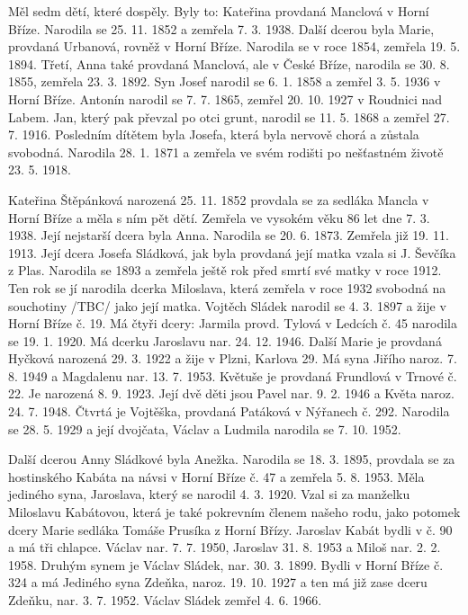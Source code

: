 \documentclass[../dejiny-rodu-prusiku.tex]{subfiles}
\begin{document}
Měl sedm dětí, které dospěly. Byly to: Kateřina provdaná Manclová v Horní Bříze. Narodila se 25. 11. 1852 a zemře­la 7. 3. 1938. Další dcerou byla Marie, provdaná Urbanová, rovněž v Horní Bříze. Narodila se v roce 1854, zemře­la 19. 5. 1894. Třetí, Anna také provdaná Manclová, ale v České Bříze, narodila se 30. 8. 1855, zemřela 23. 3. 1892. Syn Josef narodil se 6. 1. 1858 a zemřel 3. 5. 1936 v Horní Bříze. Antonín narodil se 7. 7. 1865, zemřel 20. 10. 1927 v Roudnici nad Labem. Jan, který pak převzal po otci grunt, narodil se 11. 5. 1868 a zemřel 27. 7. 1916. Posledním dítě­tem byla Josefa, která byla nervově chorá a zůstala svobodná. Narodila 28. 1. 1871 a zemřela ve svém rodišti po nešťastném životě 23. 5. 1918.

Kateřina Štěpánková narozená 25. 11. 1852 provdala se za sedláka Mancla v Horní Bříze a měla s ním pět dětí. Zemřela ve vysokém věku 86 let dne 7. 3. 1938. Její nejstarší dcera byla Anna. Narodila se 20. 6. 1873. Zemřela již 19. 11. 1913. Její dcera Josefa Sládková, jak byla provdaná její matka vzala si J. Ševčíka z Plas. Narodila se 1893 a zemře­la ještě rok před smrtí své matky v roce 1912. Ten rok se jí narodila dcerka Miloslava, která zemřela v roce 1932 svobodná na souchotiny /TBC/ jako její matka. Vojtěch Sládek narodil se 4. 3. 1897 a žije v Horní Bříze č. 19. Má čtyři dcery: Jarmila provd. Tylová v Ledcích č. 45 narodila se 19. 1. 1920. Má dcerku Jaroslavu nar. 24. 12. 1946. Další Marie je provdaná Hyčková narozená 29. 3. 1922 a ži­je v Plzni, Karlova 29. Má syna Jiřího naroz. 7. 8. 1949 a Magdalenu nar. 13. 7. 1953. Květuše je provdaná Frundlová v Trnové č. 22. Je narozená 8. 9. 1923. Její dvě děti jsou Pavel nar. 9. 2. 1946 a Květa naroz. 24. 7. 1948. Čtvrtá je Vojtěška, provdaná Patáková v Nýřanech č. 292. Narodila se 28. 5. 1929 a její dvojčata, Václav a Ludmila narodi­la se 7. 10. 1952.

Další dcerou Anny Sládkové byla Anežka. Narodila se 18. 3. 1895, provdala se za hostinského Kabáta na návsi v Horní Bříze č. 47 a zemřela 5. 8. 1953. Měla jediného syna, Jaroslava, který se narodil 4. 3. 1920. Vzal si za manžel­ku Miloslavu Kabátovou, která je také pokrevním členem našeho rodu, jako potomek dcery Marie sedláka Tomáše Prusíka z Horní Břízy. Jaroslav Kabát bydli v č. 90 a má tři chlapce. Václav nar. 7. 7. 1950, Jaroslav 31. 8. 1953 a Miloš nar. 2. 2. 1958. Druhým synem je Václav Sládek, nar. 30. 3. 1899. Bydli v Horní Bříze č. 324 a má Jediného syna Zdeňka, naroz. 19. 10. 1927 a ten má již zase dceru Zdeňku, nar. 3. 7. 1952. Václav Sládek zemřel 4. 6. 1966.
\end{document}
